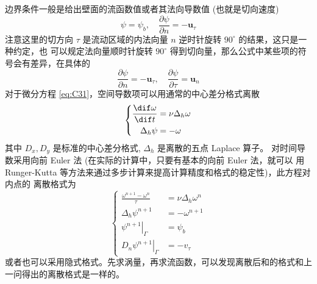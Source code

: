 \documentclass[12pt]{article}
\begin{document}
边界条件一般是给出壁面的流函数值或者其法向导数值 (也就是切向速度)
\begin{equation}
	\psi=\psi_{b}, \quad \frac{\partial \psi}{\partial n}=-\bm{u}_{\tau}
\end{equation}
注意这里的切方向 $\tau$ 是流动区域的内法向量 ${n}$ 逆时针旋转 $90^{\circ}$ 的结果，这只是一种约定，也
可以规定法向量顺时针旋转 $90^{\circ}$ 得到切向量，那么公式中某些项的符号会有差异，在具体的
\begin{equation}
	\frac{\partial \psi}{\partial n}=-\bm{u}_{\tau}, \quad \frac{\partial \psi}{\partial \tau}=\bm{u}_{n}
\end{equation}
对于微分方程 \cref{eq:C31}，空间导数项可以用通常的中心差分格式离散
\begin{equation}
	\left\{\begin{aligned}
		\frac{\dif \omega}{\dif t} & =\nu \Delta_{h} \omega \\
		\Delta_{h} \psi            & =-\omega
	\end{aligned}\right.
\end{equation}
其中 $D_{x}, D_{y}$ 是标准的中心差分格式, $\Delta_{h}$ 是离散的五点 Laplace 算子。 对时间导数采用向前 Euler 法 (在实际的计算中，只要有基本的向前 Euler 法，就可以
用 Runger-Kutta 等方法来通过多步计算来提高计算精度和格式的稳定性)，此方程对内点的
离散格式为
\begin{equation}
	\left\{\begin{aligned}
		\frac{\omega^{n+1}-\omega^{n}}{\tau}   & =\nu \Delta_{h} \omega^{n} \\
		\Delta_{h} \psi^{n+1}                  & =-\omega^{n+1}             \\
		\left.\psi^{n+1}\right|_{\Gamma}       & =\psi_{b}                  \\
		\left.D_{n} \psi^{n+1}\right|_{\Gamma} & =-v_{\tau}
	\end{aligned}\right.
\end{equation}
或者也可以采用隐式格式。先求涡量，再求流函数，可以发现离散后和的格式和上一问得出的离散格式是一样的。




\nocite{*}


\end{document}
